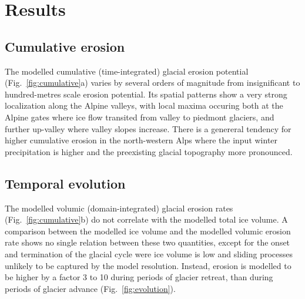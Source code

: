 \documentclass[utf8]{article}
\begin{document}
\section{Results}

\subsection{Cumulative erosion}

    The modelled cumulative (time-integrated) glacial erosion potential
    (Fig.~\ref{fig:cumulative}a) varies by several orders of magnitude
    from insignificant to hundred-metres scale erosion
    potential. Its spatial patterns show a very
    strong localization along the Alpine valleys, with local maxima occuring both at
    the Alpine gates where ice flow transited from valley to piedmont glaciers,
    and further up-valley where valley slopes increase.
    There is a genereral tendency for higher cumulative erosion in the
    north-western Alps where the input winter precipitation
    \citep[WorldClim,][Fig.~1h]{Seguinot.etal.2018} is higher and the
    preexisting glacial topography more pronounced.

\subsection{Temporal evolution}

    The modelled volumic (domain-integrated) glacial erosion rates
    (Fig.~\ref{fig:cumulative}b) do not correlate with the modelled total ice
    volume. A comparison between the modelled ice volume and the modelled
    volumic erosion rate shows no single relation between these two quantities, except
    for the onset and termination of the glacial cycle were ice volume is low
    and sliding processes unlikely to be captured by the model resolution.
    Instead, erosion is modelled to be higher by a factor 3 to 10 during
    periods of glacier retreat, than during periods of glacier advance
    (Fig.~\ref{fig:evolution}).

\end{document}
